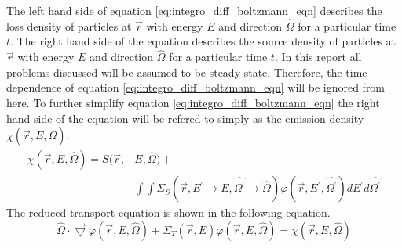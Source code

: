 The left hand side of equation \ref{eq:integro_diff_boltzmann_eqn} describes 
the loss density of particles at $\vec{r}$ with energy $E$ and direction 
$\hat{\Omega}$ for a particular time $t$. The right hand side of the equation 
describes the source density of particles at $\vec{r}$ with energy $E$ and 
direction $\hat{\Omega}$ for a particular time $t$. In this report all
problems discussed will be assumed to be steady state. Therefore, the time
dependence of equation \ref{eq:integro_diff_boltzmann_eqn} will be ignored 
from here. To further simplify equation \ref{eq:integro_diff_boltzmann_eqn} the 
right hand side of the equation will be refered to simply as the emission 
density $\chi(\vec{r},E,\hat{\Omega})$.
\begin{equation}
  \begin{split}
    \chi(\vec{r},E,\hat{\Omega}) = S(\vec{r},&E,\hat{\Omega}) + \\
    & \int\int \Sigma_S(\vec{r},E^{'} \to E,\hat{\Omega^{'}} \to \hat{\Omega})
    \varphi(\vec{r},E^{'},\hat{\Omega^{'}}) dE^{'}d\hat{\Omega^{'}}
  \end{split}
  \label{eq:emission_density}
\end{equation}
The reduced transport equation is shown in the following equation.
\begin{equation}
  \hat{\Omega} \cdot \vec{\bigtriangledown} \varphi(\vec{r},E,\hat{\Omega})
  + \Sigma_T(\vec{r},E) \varphi(\vec{r},E,\hat{\Omega}) =  
 \chi(\vec{r},E,\hat{\Omega})
  \label{eq:reduced_transport_eqn}
\end{equation}

